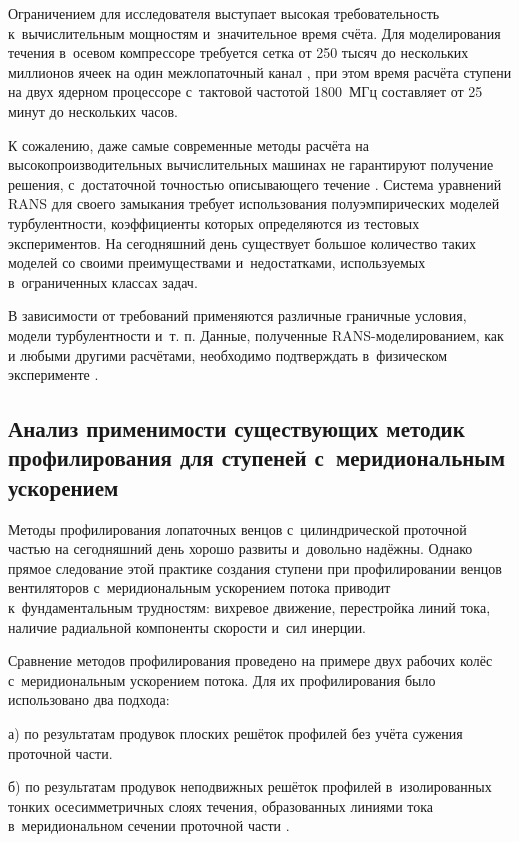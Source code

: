 Ограничением для исследователя выступает высокая требовательность к~вычислительным мощностям и~значительное время счёта.
Для моделирования течения в~осевом компрессоре требуется сетка от 250 тысяч до нескольких миллионов ячеек на один межлопаточный канал \autocite{Komarov2016, Martirosyan2019}, при этом время расчёта ступени на двух ядерном процессоре с~тактовой частотой 1800~МГц составляет от 25 минут до нескольких часов.

К сожалению, даже самые современные методы расчёта на высокопроизводительных вычислительных машинах не гарантируют получение решения, с~достаточной точностью описывающего течение \autocite{Raje2025, Lopez2022, Launder1974, Komarov2016}.
Система уравнений RANS для своего замыкания требует использования полуэмпирических моделей турбулентности, коэффициенты которых определяются из тестовых экспериментов.
На сегодняшний день существует большое количество таких моделей со своими преимуществами и~недостатками, используемых в~ограниченных классах задач.

В зависимости от требований применяются различные граничные условия, модели турбулентности и~т. п.
Данные, полученные RANS-моделированием, как и любыми другими расчётами, необходимо подтверждать в~физическом эксперименте \autocite{Michaud2016, Pandya2020}.

\subsection{Анализ применимости существующих методик профилирования для ступеней с~меридиональным ускорением}

Методы профилирования лопаточных венцов с~цилиндрической проточной частью на сегодняшний день хорошо развиты и~довольно надёжны.
Однако прямое следование этой практике создания ступени при профилировании венцов вентиляторов с~меридиональным ускорением потока приводит к~фундаментальным трудностям: вихревое движение, перестройка линий тока, наличие радиальной компоненты скорости и~сил инерции.

Сравнение методов профилирования проведено на примере двух рабочих колёс с~меридиональным ускорением потока.
Для их профилирования было использовано два подхода:

а) по результатам продувок плоских решёток профилей без учёта сужения проточной части.

б) по результатам продувок неподвижных решёток профилей в~изолированных тонких осесимметричных слоях течения, образованных линиями тока в~меридиональном сечении проточной части \autocite{Nikitin1966}.

